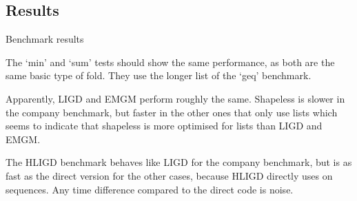 \clearpage{}
\subsection{Results}
\begin{table}[t]
\centering

\caption{Benchmark results}
\label{bench}
\end{table}
The `min' and `sum' tests should show the same performance, as both are the
same basic type of fold. They use the longer list of the `geq' benchmark.

Apparently, LIGD and EMGM perform roughly the same. Shapeless is slower in the
company benchmark, but faster in the other ones that only use lists which seems
to indicate that shapeless is more optimised for lists than LIGD and EMGM.

The HLIGD benchmark behaves like LIGD for the company benchmark, but is as fast
as the direct version for the other cases, because HLIGD directly uses
 on sequences. Any time difference compared to the direct code is
noise.
